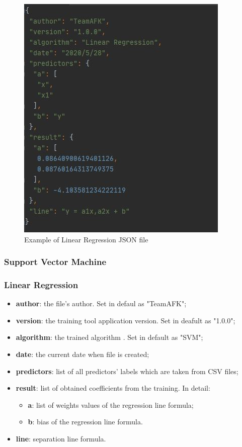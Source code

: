 		\begin{figure}[H]
		\centering
		\includegraphics[scale=0.70]{../Developer_manual/img/linear_regression_json.JPG}
		\caption{Example of Linear Regression JSON file}
	\end{figure}	
	
		\subsubsection{Support Vector Machine}
		\subsubsection{Linear Regression}
		\begin{itemize}
			\item\textbf{author}: the file's author. Set in defaul as "TeamAFK";
			\item\textbf{version}: the training tool application version. Set in deafult as "1.0.0";
			\item\textbf{algorithm}: the trained algorithm . Set in default as "SVM"; 	
			\item\textbf{date}: the current date when file is created;
			\item\textbf{predictors}: list of all predictors' labels which are taken from CSV files;
			\item\textbf{result}: list of obtained coefficients from the training. In detail:
				\begin{itemize}
					\item\textbf{a}: list of weights values of the regression line formula;
					\item\textbf{b}: bias of the regression line formula. 
				\end{itemize}
			\item\textbf{line}: separation line formula.
					
		\end{itemize}
		
